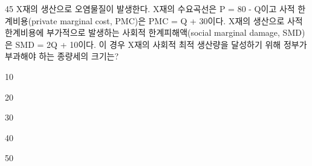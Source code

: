 \begin{question}{45}
X재의 생산으로 오염물질이 발생한다. X재의 수요곡선은 P = 80 - Q이고 사적 한계비용(private marginal cost, PMC)은 PMC = Q + 30이다. X재의 생산으로 사적 한계비용에 부가적으로 발생하는 사회적 한계피해액(social marginal damage, SMD)은 SMD = 2Q + 10이다. 이 경우 X재의 사회적 최적 생산량을 달성하기 위해 정부가 부과해야 하는 종량세의 크기는?
\begin{choices}
  \item 10
  \item 20
  \item 30
  \item 40
  \item 50
\end{choices}
\end{question}
